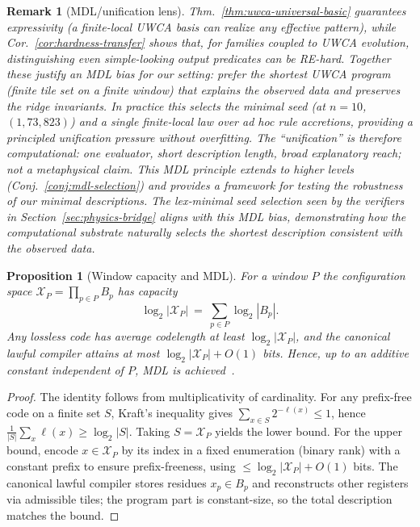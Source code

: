 \documentclass[12pt]{article}
\newtheorem{proposition}[theorem]{Proposition}
\newtheorem{remark}[theorem]{Remark}
\numberwithin{equation}{section}
\begin{document}
\begin{remark}[MDL/unification lens]\label{rem:mdl-unification}
Thm.~\ref{thm:uwca-universal-basic} guarantees expressivity (a finite-local UWCA basis can realize any effective pattern), while Cor.~\ref{cor:hardness-transfer} shows that, for families coupled to UWCA evolution, distinguishing even simple-looking output predicates can be RE-hard. Together these justify an MDL bias for our setting: prefer the shortest UWCA program (finite tile set on a finite window) that explains the observed data and preserves the ridge invariants. In practice this selects the minimal seed (at $n{=}10$, $(1,73,823)$) and a single finite-local law over ad hoc rule accretions, providing a principled unification pressure without overfitting. The ``unification'' is therefore computational: one evaluator, short description length, broad explanatory reach; not a metaphysical claim. This MDL principle extends to higher levels (Conj.~\ref{conj:mdl-selection}) and provides a framework for testing the robustness of our minimal descriptions. The lex‑minimal seed selection seen by the verifiers in Section~\ref{sec:physics-bridge} aligns with this MDL bias, demonstrating how the computational substrate naturally selects the shortest description consistent with the observed data.
\end{remark}

\begin{proposition}[Window capacity and MDL]\label{prop:capacity-mdl}
For a window $P$ the configuration space $\mathscr{X}_P=\prod_{p\in P}B_p$ has capacity
\[
\log_2|\mathscr{X}_P|\ =\ \sum_{p\in P}\log_2|B_p|.
\]
Any lossless code has average codelength at least $\log_2|\mathscr{X}_P|$, and the canonical lawful compiler attains at most $\log_2|\mathscr{X}_P|+O(1)$ bits. Hence, up to an additive constant independent of $P$, MDL is achieved~\cite{SpivackUGPFormalization,ugp-lean}.
\end{proposition}

\begin{proof}
The identity follows from multiplicativity of cardinality. For any prefix-free code on a finite set $S$, Kraft's inequality gives $\sum_{x\in S}2^{-\ell(x)}\le 1$, hence $\frac{1}{|S|}\sum_x\ell(x)\ge\log_2|S|$. Taking $S=\mathscr{X}_P$ yields the lower bound. For the upper bound, encode $x\in\mathscr{X}_P$ by its index in a fixed enumeration (binary rank) with a constant prefix to ensure prefix-freeness, using $\le \log_2|\mathscr{X}_P|+O(1)$ bits. The canonical lawful compiler stores residues $x_p\in B_p$ and reconstructs other registers via admissible tiles; the program part is constant-size, so the total description matches the bound.
\end{proof}
\end{document}

